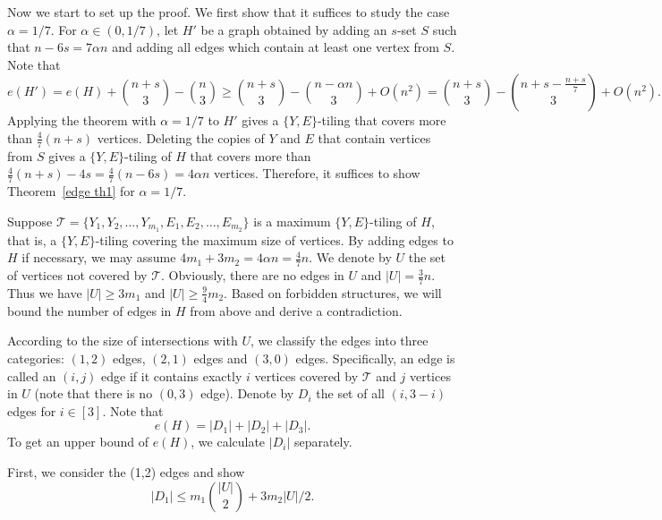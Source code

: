 \documentclass[11pt, reqno]{amsart}    	%
\theoremstyle{definition}
\def\cT{\mathcal T}
\numberwithin{equation}{section}
\begin{document}
Now we start to set up the proof.
We first show that it suffices to study the case $\alpha=1/7$.
For $\alpha\in (0,1/7)$, let $H'$ be a graph obtained by adding an $ s$-set $S$ such that $n-6s = 7\alpha n$ and adding all edges which contain at least one vertex from $S$. 
	Note that \[e(H') = e(H)+\binom{n+s}{3}-\binom{n}{3} \ge \binom{n+s}{3} - \binom{n-\alpha n}{3} +O(n^2)= \binom{n+s}{3}-\binom{n+s-\frac{n+s}{7}}{3} + O(n^2).\]
	Applying the theorem with $\alpha=1/7$ to $H'$ gives a $\{Y, E\}$-tiling that covers more than $\frac{4}{7}(n+s)$ vertices. Deleting the copies of $Y$ and $E$ that contain vertices from $S$ gives a $\{Y, E\}$-tiling of $H$ that covers more than $\frac{4}{7}(n+s)-4s = \frac{4}{7}(n-6s) = 4\alpha n$ vertices.
	Therefore, it suffices to show Theorem~\ref{edge th1} for $\alpha=1/7$.
	
		Suppose  $ \cT=\{Y_1,Y_2,\dots,Y_{m_{1}},E_1,E_2,\dots,E_{m_{2}}\} $ is a maximum $\{Y,E\}$-tiling of $H$, that is, a $\{Y,E\}$-tiling covering the maximum size of vertices. 
	By adding edges to $H$ if necessary, we may assume $4m_1+3m_2=4\alpha n=\frac{4}{7}n$. 
	We denote by $U$ the set of vertices not covered by $\cT$. Obviously, there are no edges in $U$ and $|U|=\frac{3}{7}n.$ Thus we have $|U|\ge 3m_1$ and $|U|\ge \frac{9}{4}m_2$. Based on forbidden structures, we will bound the  number of edges in $H$ from above and derive a contradiction. 
	
	According to the size of intersections with $U$, 	we classify the edges into three categories: $(1,2)$ edges, $(2,1)$ edges and $(3,0)$ edges. Specifically, an edge is called an $(i,j)$ edge if it contains exactly $i$ vertices covered by $\cT$ and $j$ vertices in  $U$ (note that there is no $(0,3)$ edge). Denote by $D_{i}$ the set of all $(i,3-i)$ edges for $i\in[3]$.
	Note that \begin{equation}\label{eqno1_1}
		e(H)=|D_{1}|+|D_{2}|+|D_{3}|.
	\end{equation}
	To get an upper bound of $ e(H) $,  we calculate $|D_{i}|$ separately. 
	
	First, we consider the  (1,2) edges and show
	 \begin{equation}\label{eqno1_2}
		|D_{1}|\le m_1 \binom{|U|}{2}+3m_2|U|/2.
	\end{equation}
	
\end{document}
